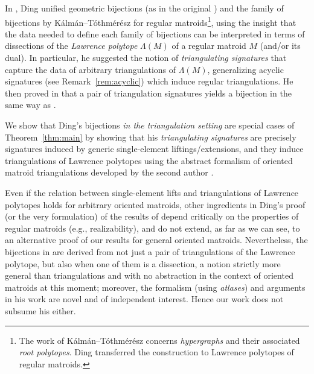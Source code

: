 \documentclass[12pt]{amsart}
\numberwithin{equation}{section}
\theoremstyle{definition}
\newcommand{\chiho}[1]{\todo[color=green!30]{\rm #1 \\ \hfill --- Ch.}}
\begin{document}
In \cite{Ding_GB2}, Ding unified geometric bijections (as in the original \cite{BBY}) and the family of bijections by K\'{a}lm\'{a}n--T\'{o}thm\'{e}r\'{e}sz \cite{TL_GB} for regular matroids\footnote{The work of K\'{a}lm\'{a}n--T\'{o}thm\'{e}r\'{e}sz  concerns {\em hypergraphs} and their associated {\em root polytopes}. Ding transferred the construction to Lawrence polytopes of regular matroids.}, using the insight that the data needed to define each family of bijections can be interpreted in terms of dissections of the {\em Lawrence polytope} $\Lambda(M)$ of a regular matroid $M$ (and/or its dual).
In particular, he suggested the notion of {\em triangulating signatures} that capture the data of arbitrary triangulations of $\Lambda(M)$, generalizing acyclic signatures (see Remark~\ref{rem:acyclic}) which induce regular triangulations.
He then proved in \cite[Theorem~1.20]{Ding_GB2} that a pair of triangulation signatures yields a bijection in the same way as \cite[Theorem~1.4.1]{BBY}.

We show that Ding's bijections {\em in the triangulation setting} are special cases of Theorem~\ref{thm:main} by showing that his \emph{triangulating signatures} are precisely signatures induced by generic single-element liftings/extensions, and they induce triangulations of Lawrence polytopes using the abstract formalism of oriented matroid triangulations developed by the second author \cite{Santos_book}.

Even if the relation between single-element lifts and triangulations of Lawrence polytopes holds for arbitrary oriented matroids, other
ingredients in Ding's proof (or the very formulation) of the results of \cite{Ding_GB2} depend critically on the properties of regular matroids (e.g., realizability), and do not extend, as far as we can see, to an alternative proof of our results for general oriented matroids.
Nevertheless, the bijections in \cite{Ding_GB2} are derived from not just a pair of triangulations of the Lawrence polytope, but also when one of them is a dissection, a notion strictly more general than triangulations and with no abstraction in the context of oriented matroids at this moment; moreover, the formalism (using {\em atlases}) and arguments in his work are novel and of independent interest. Hence our work does not subsume his either.
\end{document}
